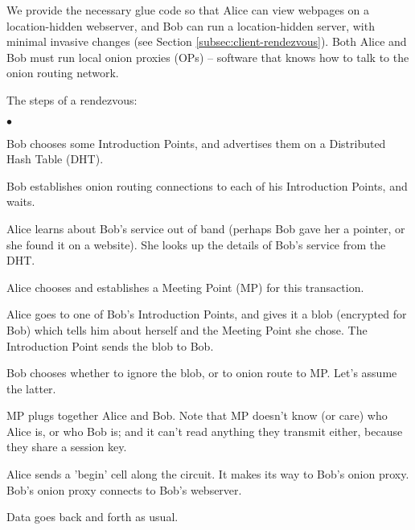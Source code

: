 \documentclass[times,10pt,twocolumn]{article}
\newenvironment{tightlist}{\begin{list}{$\bullet$}{
  \setlength{\itemsep}{0mm}
    \setlength{\parsep}{0mm}
    }}{\end{list}}
\begin{document}
We provide the necessary glue code so that Alice can view
webpages on a location-hidden webserver, and Bob can run a
location-hidden server, with minimal invasive changes (see Section
\ref{subsec:client-rendezvous}). Both Alice and Bob must run local
onion proxies (OPs) -- software that knows how to talk to the onion
routing network.

The steps of a rendezvous:
\begin{tightlist}
\item Bob chooses some Introduction Points, and advertises them on a
      Distributed Hash Table (DHT).
\item Bob establishes onion routing connections to each of his
      Introduction Points, and waits.
\item Alice learns about Bob's service out of band (perhaps Bob gave her
      a pointer, or she found it on a website). She looks up the details
      of Bob's service from the DHT.
\item Alice chooses and establishes a Meeting Point (MP) for this
      transaction.
\item Alice goes to one of Bob's Introduction Points, and gives it a blob
      (encrypted for Bob) which tells him about herself and the Meeting
      Point she chose. The Introduction Point sends the blob to Bob.
\item Bob chooses whether to ignore the blob, or to onion route to MP.
      Let's assume the latter.
\item MP plugs together Alice and Bob. Note that MP doesn't know (or care)
      who Alice is, or who Bob is; and it can't read anything they
      transmit either, because they share a session key.
\item Alice sends a 'begin' cell along the circuit. It makes its way
      to Bob's onion proxy. Bob's onion proxy connects to Bob's webserver.
\item Data goes back and forth as usual.
\end{tightlist}
\end{document}
